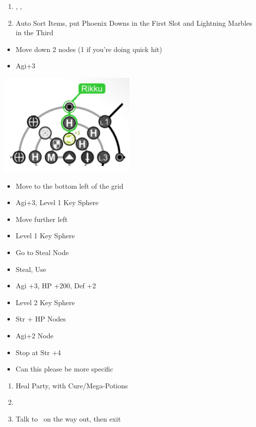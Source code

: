 \begin{enumerate}[resume]
	\item \cs[1:50], \sd, \sd
	\item Auto Sort Items, put Phoenix Downs in the First Slot and Lightning Marbles in the Third
\end{enumerate}
\begin{spheregrid}
\begin{itemize}
	\rikkuf
	\begin{itemize}
		\item Move down 2 nodes (1 if you're doing quick hit)
		\item Agi+3
	\end{itemize}
	\includegraphics{graphics/macalaniarikku}
	\kimahrif
	\begin{itemize}
		\item Move to the bottom left of the grid
		\item Agi+3, Level 1 Key Sphere
		\item Move further left
		\item Level 1 Key Sphere
		\item Go to Steal Node
		\item Steal, Use
	\end{itemize}
	\yunaf
	\begin{itemize}
		\item Agi +3, HP +200, Def +2
		\item Level 2 Key Sphere
		\item Str + HP Nodes
		\item Agi+2 Node
		\item Stop at Str +4
		\item Can this please be more specific
	\end{itemize}
\end{itemize}
\end{spheregrid}
\begin{enumerate}[resume]
	\item Heal Party, with Cure/Mega-Potions
	\item \formation{\tidus}{\lulu}{\kimahri}
	\item Talk to \auron\ on the way out, then exit
\end{enumerate}
\vfill \ 
\newpage
